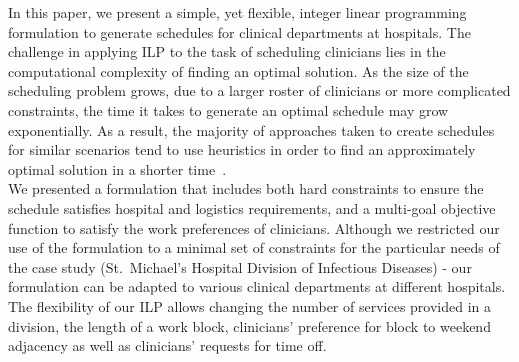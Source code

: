 In this paper, we present a simple, yet flexible, integer linear programming
formulation to generate schedules for clinical departments at hospitals.
The challenge in applying ILP to the task of scheduling clinicians lies in the
computational complexity of finding an optimal solution. As the size of the
scheduling problem grows, due to a larger roster of clinicians or more
complicated constraints, the time it takes to generate an optimal schedule may
grow exponentially.
As a result, the majority of approaches taken to create schedules for similar
scenarios tend to use heuristics in order to find an approximately optimal
solution in a shorter time~\cite{burke_state_2004}. \\  %


We presented a formulation that includes both hard constraints to ensure the
schedule satisfies hospital and logistics requirements, and a multi-goal
objective function to satisfy the work preferences of clinicians.
Although we restricted our use of the formulation to a minimal set of
constraints for the particular needs of the case study (St.\ Michael's Hospital
Division of Infectious Diseases) - our formulation can be adapted to various
clinical departments at different hospitals. The flexibility of our ILP allows
changing the number of services provided in a division, the length of a work
block, clinicians' preference for block to weekend adjacency as well as
clinicians' requests for time off. \\

